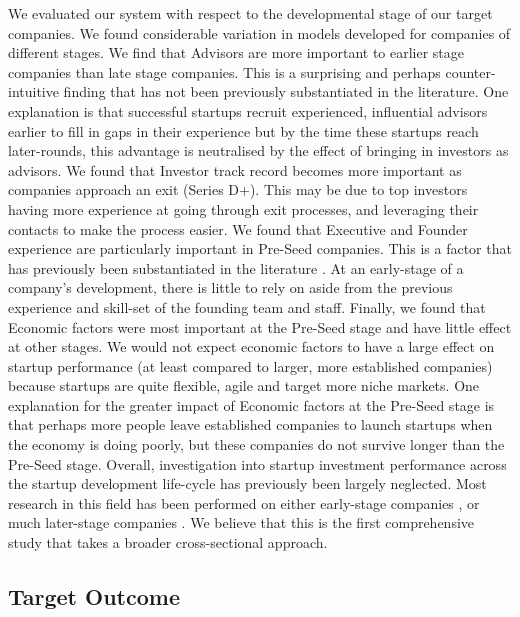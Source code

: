 \documentclass[../thesis/thesis.tex]{subfiles}
\begin{document}
We evaluated our system with respect to the developmental stage of our target companies. We found considerable variation in models developed for companies of different stages. We find that Advisors are more important to earlier stage companies than late stage companies. This is a surprising and perhaps counter-intuitive finding that has not been previously substantiated in the literature. One explanation is that successful startups recruit experienced, influential advisors earlier to fill in gaps in their experience but by the time these startups reach later-rounds, this advantage is neutralised by the effect of bringing in investors as advisors. We found that Investor track record becomes more important as companies approach an exit (Series D+). This may be due to top investors having more experience at going through exit processes, and leveraging their contacts to make the process easier. We found that Executive and Founder experience are particularly important in Pre-Seed companies. This is a factor that has previously been substantiated in the literature \cite{beckwith2016,an2015}. At an early-stage of a company's development, there is little to rely on aside from the previous experience and skill-set of the founding team and staff. Finally, we found that Economic factors were most important at the Pre-Seed stage and have little effect at other stages. We would not expect economic factors to have a large effect on startup performance (at least compared to larger, more established companies) because startups are quite flexible, agile and target more niche markets. One explanation for the greater impact of Economic factors at the Pre-Seed stage is that perhaps more people leave established companies to launch startups when the economy is doing poorly, but these companies do not survive longer than the Pre-Seed stage. Overall, investigation into startup investment performance across the startup development life-cycle has previously been largely neglected. Most research in this field has been performed on either early-stage companies \cite{beckwith2016,stone2014,yuan2016,ahlers2015}, or much later-stage companies \cite{bhat2011}. We believe that this is the first comprehensive study that takes a broader cross-sectional approach.

\subsection{Target Outcome}
\end{document}
